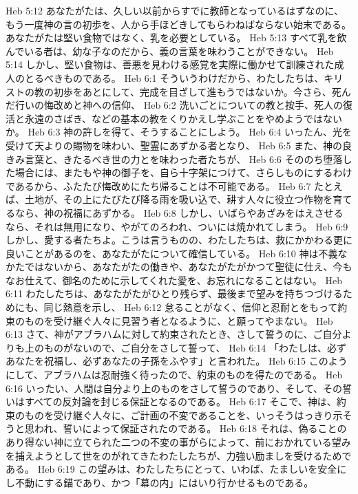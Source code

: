 Heb 5:12  あなたがたは、久しい以前からすでに教師となっているはずなのに、もう一度神の言の初歩を、人から手ほどきしてもらわねばならない始末である。あなたがたは堅い食物ではなく、乳を必要としている。
Heb 5:13  すべて乳を飲んでいる者は、幼な子なのだから、義の言葉を味わうことができない。
Heb 5:14  しかし、堅い食物は、善悪を見わける感覚を実際に働かせて訓練された成人のとるべきものである。
Heb 6:1  そういうわけだから、わたしたちは、キリストの教の初歩をあとにして、完成を目ざして進もうではないか。今さら、死んだ行いの悔改めと神への信仰、
Heb 6:2  洗いごとについての教と按手、死人の復活と永遠のさばき、などの基本の教をくりかえし学ぶことをやめようではないか。
Heb 6:3  神の許しを得て、そうすることにしよう。
Heb 6:4  いったん、光を受けて天よりの賜物を味わい、聖霊にあずかる者となり、
Heb 6:5  また、神の良きみ言葉と、きたるべき世の力とを味わった者たちが、
Heb 6:6  そののち堕落した場合には、またもや神の御子を、自ら十字架につけて、さらしものにするわけであるから、ふたたび悔改めにたち帰ることは不可能である。
Heb 6:7  たとえば、土地が、その上にたびたび降る雨を吸い込で、耕す人々に役立つ作物を育てるなら、神の祝福にあずかる。
Heb 6:8  しかし、いばらやあざみをはえさせるなら、それは無用になり、やがてのろわれ、ついには焼かれてしまう。
Heb 6:9  しかし、愛する者たちよ。こうは言うものの、わたしたちは、救にかかわる更に良いことがあるのを、あなたがたについて確信している。
Heb 6:10  神は不義なかたではないから、あなたがたの働きや、あなたがたがかつて聖徒に仕え、今もなお仕えて、御名のために示してくれた愛を、お忘れになることはない。
Heb 6:11  わたしたちは、あなたがたがひとり残らず、最後まで望みを持ちつづけるためにも、同じ熱意を示し、
Heb 6:12  怠ることがなく、信仰と忍耐とをもって約束のものを受け継ぐ人々に見習う者となるように、と願ってやまない。
Heb 6:13  さて、神がアブラハムに対して約束されたとき、さして誓うのに、ご自分よりも上のものがないので、ご自分をさして誓って、
Heb 6:14  「わたしは、必ずあなたを祝福し、必ずあなたの子孫をふやす」と言われた。
Heb 6:15  このようにして、アブラハムは忍耐強く待ったので、約束のものを得たのである。
Heb 6:16  いったい、人間は自分より上のものをさして誓うのであり、そして、その誓いはすべての反対論を封じる保証となるのである。
Heb 6:17  そこで、神は、約束のものを受け継ぐ人々に、ご計画の不変であることを、いっそうはっきり示そうと思われ、誓いによって保証されたのである。
Heb 6:18  それは、偽ることのあり得ない神に立てられた二つの不変の事がらによって、前におかれている望みを捕えようとして世をのがれてきたわたしたちが、力強い励ましを受けるためである。
Heb 6:19  この望みは、わたしたちにとって、いわば、たましいを安全にし不動にする錨であり、かつ「幕の内」にはいり行かせるものである。
